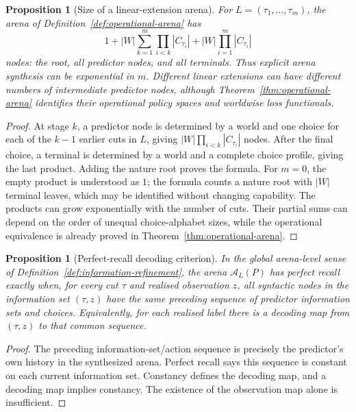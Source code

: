\documentclass[11pt]{article}
\theoremstyle{plain}
\newtheorem{proposition}[theorem]{Proposition}
\theoremstyle{definition}
\theoremstyle{remark}
\begin{document}
\begin{proposition}[Size of a linear-extension arena]
\label{prop:operational-arena-size}
For $L=(\tau_1,\ldots,\tau_m)$, the arena of
Definition~\ref{def:operational-arena} has
\[
1+|W|\sum_{k=1}^{m}\prod_{i<k}|C_{\tau_i}|
+|W|\prod_{i=1}^{m}|C_{\tau_i}|
\]
nodes: the root, all predictor nodes, and all terminals. Thus explicit arena
synthesis can be exponential in $m$. Different linear extensions can have
different numbers of intermediate predictor nodes, although
Theorem~\ref{thm:operational-arena} identifies their operational policy spaces
and worldwise loss functionals.
\end{proposition}

\begin{proof}
At stage $k$, a predictor node is determined by a world and one choice for each
of the $k-1$ earlier cuts in $L$, giving
$|W|\prod_{i<k}|C_{\tau_i}|$ nodes. After the final choice, a terminal is
determined by a world and a complete choice profile, giving the last product.
Adding the nature root proves the formula. For $m=0$, the empty product is
understood as $1$; the formula counts a nature root with $|W|$ terminal leaves,
which may be identified without changing capability. The products can grow
exponentially with the number of cuts. Their partial sums can depend on the
order of unequal choice-alphabet sizes, while the operational equivalence is
already proved in Theorem~\ref{thm:operational-arena}.
\end{proof}

\begin{proposition}[Perfect-recall decoding criterion]
\label{prop:operational-perfect-recall}
In the global arena-level sense of Definition~\ref{def:information-refinement},
the arena $\mathcal A_L(P)$ has perfect recall exactly when, for every cut
$\tau$ and realised observation $z$, all syntactic nodes in the information set
$(\tau,z)$ have the same preceding sequence of predictor information sets and
choices. Equivalently, for each realised label there is a decoding map from
$(\tau,z)$ to that common sequence.
\end{proposition}

\begin{proof}
The preceding information-set/action sequence is precisely the predictor's own
history in the synthesized arena. Perfect recall says this sequence is constant
on each current information set. Constancy defines the decoding map, and a
decoding map implies constancy. The existence of the observation map alone is
insufficient.
\end{proof}
\end{document}
